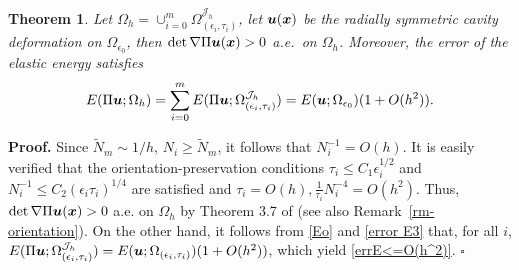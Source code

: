\documentclass[12pt]{article}
\renewcommand{\vec}[1]{\mbox{\boldmath$#1$}}
\newtheorem{theorem}{Theorem}[section]
\numberwithin{equation}{section}
\begin{document}
\begin{theorem}\label{theorem err=O(h^2)}
Let $\Omega_h=\cup_{i=0}^m \Omega^{\mathcal{J}_h}_{(\epsilon_i, \tau_i)}$,
let $\vec{u}(\vec{x})$ be the radially symmetric cavity deformation on
$\Omega_{\epsilon_0}$, then
$\det \nabla \Pi \vec{u}(\vec{x})>0$ a.e.~on $\Omega_h$. Moreover, the error of the
elastic energy satisfies
\begin{equation}\label{errE<=O(h^2)}
E(\Pi \vec{u};\Omega_h)=\sum\limits_{i=0}^m E(\Pi \vec{u};
\Omega^{\mathcal{J}_h}_{(\epsilon_i, \tau_i)})=E(\vec{u}; \Omega_{\epsilon_0} )(1+O(h^2)).
\end{equation}
\end{theorem}
\textbf{Proof.} Since $\tilde{N}_m\sim 1/h$, $N_i\ge \tilde{N}_m$, it follows that
$N_i^{-1}=O(h)$. It is easily verified that the orientation-preservation conditions
$\tau_i\le C_1\epsilon_i^{1/2}$ and $N_i^{-1}\le C_2(\epsilon_i\tau_i)^{1/4}$ are
satisfied and $\tau_i=O(h), \frac{1}{\tau_i}N_i^{-4}=O(h^2)$. Thus,
$\det \nabla \Pi \vec{u}(\vec{x})>0$
a.e. on $\Omega_h$ by Theorem 3.7 of \cite{detp} (see also Remark~\ref{rm-orientation}).
On the other hand, it follows from \eqref{Eo} and \eqref{error E3} that, for all $i$,
$E(\Pi \vec{u}; \Omega^{\mathcal{J}_h}_{(\epsilon_i,
\tau_i)})=E(\vec{u}; \Omega_{(\epsilon_i, \tau_i)})(1+O(h^2))$, which yield
\eqref{errE<=O(h^2)}.
\hfill $\square$
\end{document}
